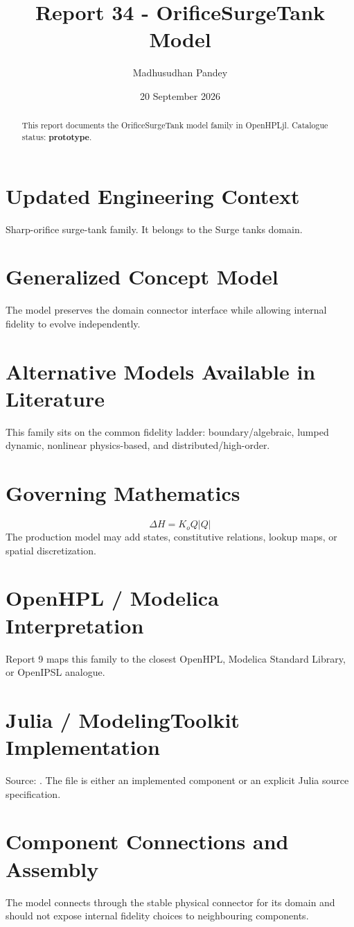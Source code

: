 \documentclass[10pt,a4paper]{article}
\title{Report 34 - OrificeSurgeTank Model}
\author{Madhusudhan Pandey}
\date{20 September 2026}
\begin{document}
\maketitle
\begin{abstract}This report documents the OrificeSurgeTank model family in OpenHPLjl. Catalogue status: \textbf{prototype}.\end{abstract}
\section{Updated Engineering Context}Sharp-orifice surge-tank family. It belongs to the Surge tanks domain.
\section{Generalized Concept Model}The model preserves the domain connector interface while allowing internal fidelity to evolve independently.
\section{Alternative Models Available in Literature}This family sits on the common fidelity ladder: boundary/algebraic, lumped dynamic, nonlinear physics-based, and distributed/high-order.
\section{Governing Mathematics}\[\Delta H=K_o Q|Q|\]The production model may add states, constitutive relations, lookup maps, or spatial discretization.
\section{OpenHPL / Modelica Interpretation}Report 9 maps this family to the closest OpenHPL, Modelica Standard Library, or OpenIPSL analogue.
\section{Julia / ModelingToolkit Implementation}Source: \texttt{}. The file is either an implemented component or an explicit Julia source specification.
\section{Component Connections and Assembly}The model connects through the stable physical connector for its domain and should not expose internal fidelity choices to neighbouring components.
\end{document}
